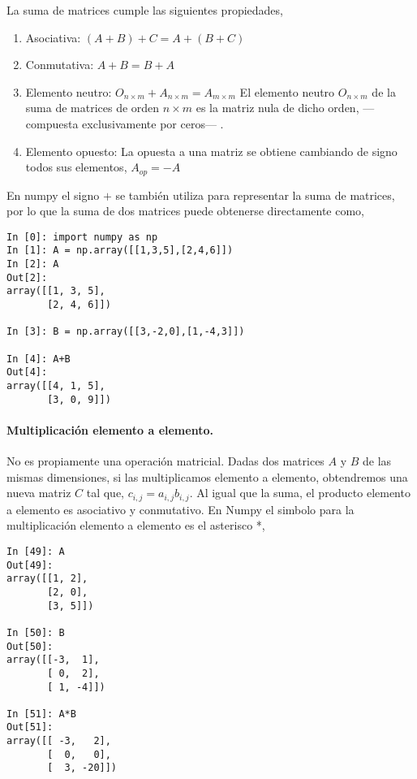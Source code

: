 \begin{paracol}{2}
La suma de matrices cumple las siguientes propiedades,
\begin{enumerate}
\item Asociativa: $(A+B)+C=A+(B+C)$
\item Conmutativa: $A+B=B+A$
\item Elemento neutro: $O_{n\times m}+A_{n\times m}=A_{m\times m}$ El elemento neutro $O_{n\times m}$ de la suma de matrices de orden $n\times m$ es la matriz nula de dicho orden, ---compuesta exclusivamente por ceros--- . 
\item Elemento opuesto: La opuesta a una matriz se obtiene cambiando de signo todos sus elementos, $A_{op}=-A$
\end{enumerate}
En numpy el signo $+$ se también utiliza para representar la suma de matrices, por lo que la suma de dos matrices puede obtenerse directamente como,
\end{paracol}
\begin{center}
    \begin{minipage}{.5\textwidth}
    \begin{verbatim}
In [0]: import numpy as np
In [1]: A = np.array([[1,3,5],[2,4,6]])
In [2]: A
Out[2]: 
array([[1, 3, 5],
       [2, 4, 6]])

In [3]: B = np.array([[3,-2,0],[1,-4,3]])

In [4]: A+B
Out[4]: 
array([[4, 1, 5],
       [3, 0, 9]])

    \end{verbatim}
        
    \end{minipage}
\end{center}
\begin{paracol}{2}
\paragraph{Multiplicación elemento a elemento.} No es propiamente una operación matricial. Dadas dos matrices $A$ y $B$ de las mismas dimensiones, si las multiplicamos elemento a elemento, obtendremos una nueva matriz $C$ tal que, $c_{i,j} = a_{i,j}b_{i,j}$. Al igual que la suma, el producto elemento a elemento es asociativo y conmutativo. 
En Numpy el simbolo para la multiplicación elemento a elemento es el asterisco *,
\end{paracol}
\begin{center}
    \begin{minipage}{.5\textwidth}
        \begin{verbatim}
In [49]: A
Out[49]: 
array([[1, 2],
       [2, 0],
       [3, 5]])

In [50]: B
Out[50]: 
array([[-3,  1],
       [ 0,  2],
       [ 1, -4]])

In [51]: A*B
Out[51]: 
array([[ -3,   2],
       [  0,   0],
       [  3, -20]])
\end{verbatim}
\end{minipage}
\end{center}
